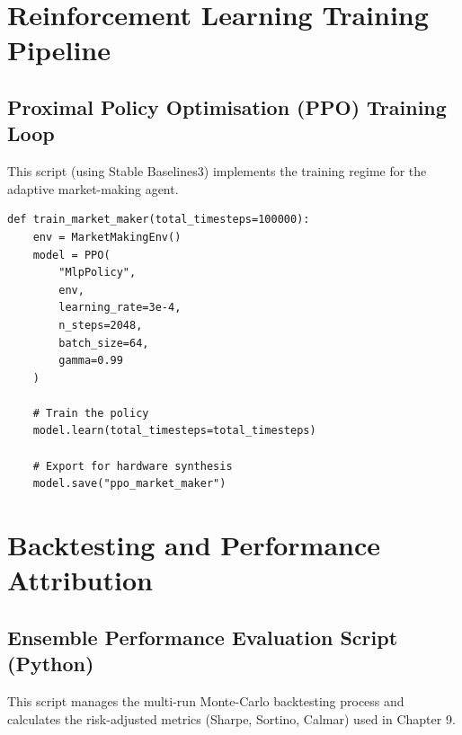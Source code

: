 \section{Reinforcement Learning Training Pipeline}
\subsection{Proximal Policy Optimisation (PPO) Training Loop}
This script (using Stable Baselines3) implements the training regime for the adaptive market-making agent.

\begin{lstlisting}[style=pythonstyle, caption={PPO training for quoting agent}, label={lst:ppo}]
def train_market_maker(total_timesteps=100000):
    env = MarketMakingEnv()
    model = PPO(
        "MlpPolicy", 
        env, 
        learning_rate=3e-4,
        n_steps=2048,
        batch_size=64,
        gamma=0.99
    )
    
    # Train the policy
    model.learn(total_timesteps=total_timesteps)
    
    # Export for hardware synthesis
    model.save("ppo_market_maker")
\end{lstlisting}

\section{Backtesting and Performance Attribution}
\subsection{Ensemble Performance Evaluation Script (Python)}
This script manages the multi-run Monte-Carlo backtesting process and calculates the risk-adjusted metrics (Sharpe, Sortino, Calmar) used in Chapter 9.

